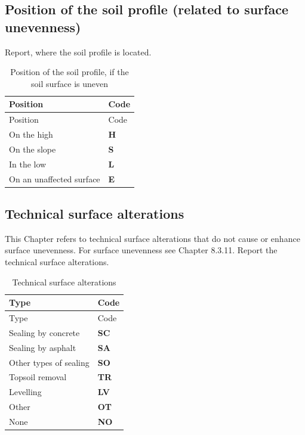 \documentclass[
  letterpaper,
  DIV=11,
  numbers=noendperiod]{scrreprt}
\begin{document}
\hypertarget{position-of-the-soil-profile-related-to-surface-unevenness}{%
\subsection{Position of the soil profile (related to surface
unevenness)}\label{position-of-the-soil-profile-related-to-surface-unevenness}}

Report, where the soil profile is located.

\begin{longtable}[]{@{}ll@{}}
\caption{Position of the soil profile, if the soil surface is
uneven}\tabularnewline
\toprule()
Position & Code \\
\midrule()
\endfirsthead
\toprule()
Position & Code \\
\midrule()
\endhead
On the high & \textbf{H} \\
On the slope & \textbf{S} \\
In the low & \textbf{L} \\
On an unaffected surface & \textbf{E} \\
\bottomrule()
\end{longtable}

\hypertarget{technical-surface-alterations}{%
\subsection{Technical surface
alterations}\label{technical-surface-alterations}}

This Chapter refers to technical surface alterations that do not cause
or enhance surface unevenness. For surface unevenness see Chapter
8.3.11. Report the technical surface alterations.

\begin{longtable}[]{@{}ll@{}}
\caption{Technical surface alterations}\tabularnewline
\toprule()
Type & Code \\
\midrule()
\endfirsthead
\toprule()
Type & Code \\
\midrule()
\endhead
Sealing by concrete & \textbf{SC} \\
Sealing by asphalt & \textbf{SA} \\
Other types of sealing & \textbf{SO} \\
Topsoil removal & \textbf{TR} \\
Levelling & \textbf{LV} \\
Other & \textbf{OT} \\
None & \textbf{NO} \\
\bottomrule()
\end{longtable}
\end{document}
